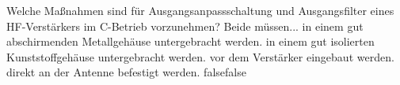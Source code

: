     {Welche Maßnahmen sind für Ausgangsanpassschaltung und Ausgangsfilter eines HF-Verstärkers im C-Betrieb vorzunehmen? Beide müssen...}
    {in einem gut abschirmenden Metallgehäuse untergebracht werden.}
    {in einem gut isolierten Kunststoffgehäuse untergebracht werden. }
    {vor dem Verstärker eingebaut werden.}
    {direkt an der Antenne befestigt werden.}
    {false}{false}